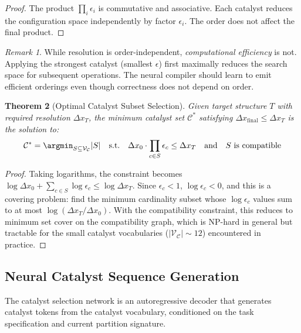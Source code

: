\documentclass[11pt,a4paper]{article}
\newtheorem{theorem}{Theorem}[section]
\theoremstyle{definition}
\theoremstyle{remark}
\newtheorem{remark}[theorem]{Remark}
\newcommand{\catalyst}{\mathcal{C}}
\newcommand{\vocab}{\mathcal{V}}
\begin{document}
\begin{proof}
The product $\prod_i \epsilon_i$ is commutative and associative. Each catalyst reduces the configuration space independently by factor $\epsilon_i$. The order does not affect the final product.
\end{proof}

\begin{remark}
While resolution is order-independent, \emph{computational efficiency} is not. Applying the strongest catalyst (smallest $\epsilon$) first maximally reduces the search space for subsequent operations. The neural compiler should learn to emit efficient orderings even though correctness does not depend on order.
\end{remark}

\begin{theorem}[Optimal Catalyst Subset Selection]
\label{thm:optimal_subset}
Given target structure $T$ with required resolution $\Delta x_T$, the minimum catalyst set $\mathcal{C}^*$ satisfying $\Delta x_{\mathrm{final}} \leq \Delta x_T$ is the solution to:
\begin{equation}
\mathcal{C}^* = \argmin_{S \subseteq \vocab_\catalyst} |S| \quad \text{s.t.} \quad \Delta x_0 \cdot \prod_{c \in S} \epsilon_c \leq \Delta x_T \quad \text{and} \quad S \text{ is compatible}
\end{equation}
\end{theorem}

\begin{proof}
Taking logarithms, the constraint becomes $\log \Delta x_0 + \sum_{c \in S} \log \epsilon_c \leq \log \Delta x_T$. Since $\epsilon_c < 1$, $\log \epsilon_c < 0$, and this is a covering problem: find the minimum cardinality subset whose $\log \epsilon_c$ values sum to at most $\log(\Delta x_T / \Delta x_0)$. With the compatibility constraint, this reduces to minimum set cover on the compatibility graph, which is NP-hard in general but tractable for the small catalyst vocabularies ($|\vocab_\catalyst| \sim 12$) encountered in practice.
\end{proof}

\subsection{Neural Catalyst Sequence Generation}

The catalyst selection network is an autoregressive decoder that generates catalyst tokens from the catalyst vocabulary, conditioned on the task specification and current partition signature.
\end{document}
